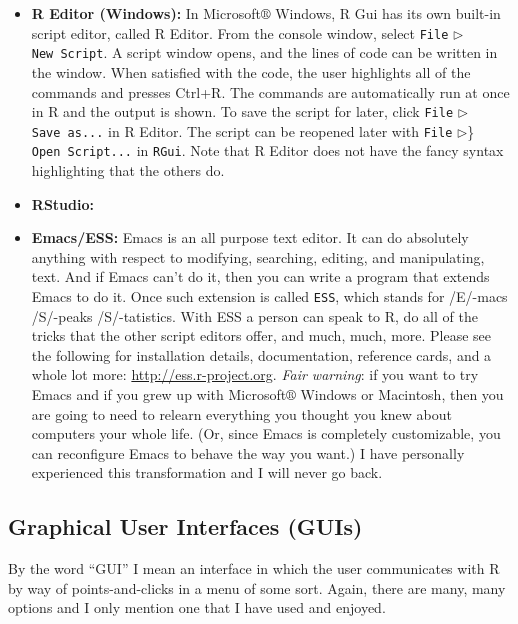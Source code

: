 \documentclass[]{book}
\providecommand{\tightlist}{%
  \setlength{\itemsep}{0pt}\setlength{\parskip}{0pt}}
\numberwithin{equation}{chapter}
\numberwithin{figure}{chapter}
\theoremstyle{plain}
\theoremstyle{definition}
\theoremstyle{remark}
\theoremstyle{definition}
\theoremstyle{definition}
\theoremstyle{remark}
\begin{document}
\begin{itemize}
\tightlist
\item
  \textbf{R Editor (Windows):} In Microsoft\(\circledR\) Windows, R Gui
  has its own built-in script editor, called R Editor. From the console
  window, select \texttt{File} \(\triangleright\) \texttt{New\ Script}.
  A script window opens, and the lines of code can be written in the
  window. When satisfied with the code, the user highlights all of the
  commands and presses \textsf{Ctrl+R}. The commands are automatically
  run at once in R and the output is shown. To save the script for
  later, click \texttt{File} \(\triangleright\) \texttt{Save\ as...} in
  R Editor. The script can be reopened later with \texttt{File}
  \(\triangleright\)\} \texttt{Open\ Script...} in \texttt{RGui}. Note
  that R Editor does not have the fancy syntax highlighting that the
  others do.
\item
  \textbf{RStudio:}
\item
  \textbf{Emacs/ESS:} Emacs is an all purpose text editor. It can do
  absolutely anything with respect to modifying, searching, editing, and
  manipulating, text. And if Emacs can't do it, then you can write a
  program that extends Emacs to do it. Once such extension is called
  \texttt{ESS}, which stands for /E/-macs /S/-peaks /S/-tatistics. With
  ESS a person can speak to R, do all of the tricks that the other
  script editors offer, and much, much, more. Please see the following
  for installation details, documentation, reference cards, and a whole
  lot more: \url{http://ess.r-project.org}. \emph{Fair warning}: if you
  want to try Emacs and if you grew up with Microsoft\(\circledR\)
  Windows or Macintosh, then you are going to need to relearn everything
  you thought you knew about computers your whole life. (Or, since Emacs
  is completely customizable, you can reconfigure Emacs to behave the
  way you want.) I have personally experienced this transformation and I
  will never go back.
\end{itemize}

\subsection{Graphical User Interfaces
(GUIs)}\label{graphical-user-interfaces-guis}

By the word ``GUI'' I mean an interface in which the user communicates
with R by way of points-and-clicks in a menu of some sort. Again, there
are many, many options and I only mention one that I have used and
enjoyed.
\end{document}
